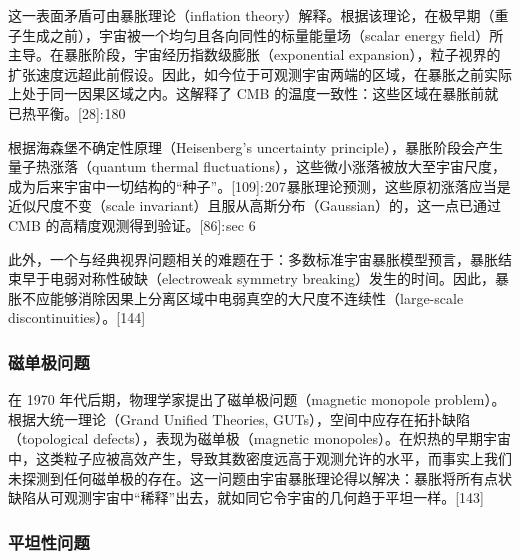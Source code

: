 这一表面矛盾可由暴胀理论（inflation theory）解释。根据该理论，在极早期（重子生成之前），宇宙被一个均匀且各向同性的标量能量场（scalar energy field）所主导。在暴胀阶段，宇宙经历指数级膨胀（exponential expansion），粒子视界的扩张速度远超此前假设。因此，如今位于可观测宇宙两端的区域，在暴胀之前实际上处于同一因果区域之内。这解释了 CMB 的温度一致性：这些区域在暴胀前就已热平衡。[28]: 180 

根据海森堡不确定性原理（Heisenberg's uncertainty principle），暴胀阶段会产生量子热涨落（quantum thermal fluctuations），这些微小涨落被放大至宇宙尺度，成为后来宇宙中一切结构的“种子”。[109]: 207 暴胀理论预测，这些原初涨落应当是近似尺度不变（scale invariant）且服从高斯分布（Gaussian）的，这一点已通过 CMB 的高精度观测得到验证。[86]: sec 6 

此外，一个与经典视界问题相关的难题在于：多数标准宇宙暴胀模型预言，暴胀结束早于电弱对称性破缺（electroweak symmetry breaking）发生的时间。因此，暴胀不应能够消除因果上分离区域中电弱真空的大尺度不连续性（large-scale discontinuities）。[144]
\subsubsection{磁单极问题}
在 1970 年代后期，物理学家提出了磁单极问题（magnetic monopole problem）。根据大统一理论（Grand Unified Theories, GUTs），空间中应存在拓扑缺陷（topological defects），表现为磁单极（magnetic monopoles）。在炽热的早期宇宙中，这类粒子应被高效产生，导致其数密度远高于观测允许的水平，而事实上我们未探测到任何磁单极的存在。这一问题由宇宙暴胀理论得以解决：暴胀将所有点状缺陷从可观测宇宙中“稀释”出去，就如同它令宇宙的几何趋于平坦一样。[143]
\subsubsection{平坦性问题}




